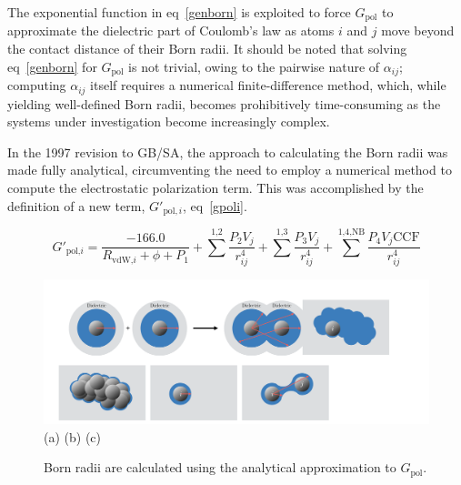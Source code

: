\documentclass[12pt]{report}
\def\equlab{eq}\def\equslab{Eqs.}
\newcommand*\eq[1]{\equlab~\ref{#1}}
\begin{document}
The exponential function in \eq{genborn} is exploited to force $G_{\textrm{pol}}$ to approximate the dielectric part of Coulomb's law as atoms $i$ and $j$ move beyond the contact distance of their Born radii. It should be noted that solving \eq{genborn} for $G_{\textrm{pol}}$ is not trivial, owing to the pairwise nature of $\alpha_{ij}$; computing $\alpha_{ij}$ itself requires a numerical finite-difference method, which, while yielding well-defined Born radii, becomes prohibitively time-consuming as the systems under investigation become increasingly complex.

In the 1997 revision to GB/SA, \cite{qiu} the approach to calculating the Born radii was made fully analytical, circumventing the need to employ a numerical method to compute the electrostatic polarization term. This was accomplished by the definition of a new term, $G'_{\textrm{pol},i}$, \eq{gpoli}.

\begin{equation}
\label{gpoli}
G'_{\textrm{pol,}i} = \frac{-166.0}{R_{\textrm{vdW,}i}+\phi+P_1}+\sum^{\textrm{1,2}} \frac{P_2 V_j}{r_{ij}^{4}} + \sum^{\textrm{1,3}} \frac{P_3 V_j}{r_{ij}^{4}} + \sum^{\textrm{1,4,NB}} \frac{P_4 V_j \textrm{CCF}}{r_{ij}^{4}}
\end{equation}
\vspace*{-0.1cm}

\begin{figure}[b]
\centering
\includegraphics[scale=0.3]{figures/pdf/gpoli.pdf}\\
(a) \hspace*{4.4cm} (b) \hspace*{4.4cm} (c)
\caption{Born radii are calculated using the analytical approximation to $G_{\textrm{pol}}$.}
\label{figpoli}
\end{figure}
\end{document}
